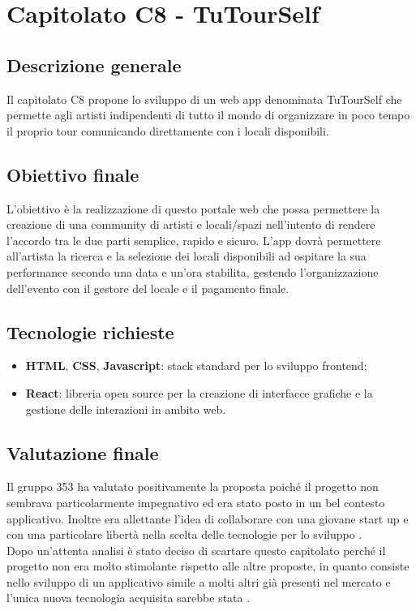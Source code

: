\documentclass[StudioDiFattibilità.tex]{subfiles}
\begin{document}
\chapter{Capitolato C8 - TuTourSelf}
\section{Descrizione generale}
Il capitolato C8 propone lo sviluppo di un web app denominata TuTourSelf che permette agli artisti indipendenti di tutto il mondo di organizzare in poco tempo il proprio tour comunicando direttamente con i locali disponibili.
\section{Obiettivo finale}
L’obiettivo è la realizzazione di questo portale web che possa permettere la creazione di una community di artisti e locali/spazi nell'intento di rendere l’accordo tra le due parti semplice, rapido e sicuro. L'app dovrà permettere all'artista la ricerca e la selezione dei locali disponibili ad ospitare la sua performance secondo una data e un'ora stabilita, gestendo l’organizzazione dell'evento con il gestore del locale e il pagamento finale.
\section{Tecnologie richieste}
\begin{itemize}
	\item \textbf{HTML}, \textbf{CSS}, \textbf{Javascript}: stack standard per lo sviluppo frontend;
	\item \textbf{React}: libreria open source  per la creazione di interfacce grafiche e la gestione delle interazioni in ambito web.
\end{itemize}
\section{Valutazione finale}
Il gruppo 353 ha valutato positivamente la proposta poiché il progetto non sembrava particolarmente impegnativo ed era stato posto in un bel contesto applicativo. Inoltre era allettante l'idea di collaborare con una giovane start up e con una particolare libertà nella scelta delle tecnologie per lo sviluppo .\\
Dopo un'attenta analisi è stato deciso di scartare questo capitolato perché il progetto non era molto stimolante rispetto alle altre proposte, in quanto consiste nello sviluppo di un applicativo simile a molti altri già presenti nel mercato e l'unica nuova tecnologia acquisita sarebbe stata .
\end{document}
